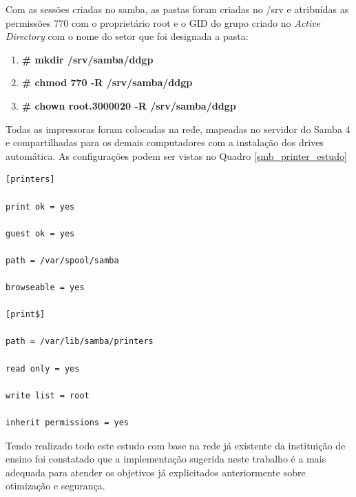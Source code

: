 Com as sessões criadas no samba, as pastas foram criadas no /srv e atribuídas as permissões 770 com o proprietário root e o GID do grupo criado no \textit{Active Directory} com o nome do setor que foi designada a pasta:

\begin{enumerate}
	\item \textbf{\# mkdir /srv/samba/ddgp}
	\item \textbf{\# chmod 770 -R /srv/samba/ddgp}
	\item \textbf{\# chown root.3000020 -R /srv/samba/ddgp}
\end{enumerate}

Todas as impressoras foram colocadas na rede, mapeadas no servidor do Samba 4 e compartilhadas para os demais computadores com a instalação dos drives automática. As configurações podem ser vistas no Quadro \ref{smb_printer_estudo}\\

\begin{lstlisting}[caption=Arquivo /etc/smb.conf com as variáveis aplicadas no estudo de caso para compartilhar impressoras.,label={smb_printer_estudo}]
[printers] 

print ok = yes 

guest ok = yes

path = /var/spool/samba 

browseable = yes

[print$] 

path = /var/lib/samba/printers 

read only = yes

write list = root 

inherit permissions = yes
\end{lstlisting}

Tendo realizado todo este estudo com base na rede já existente da instituição de ensino foi constatado que a implementação sugerida neste trabalho é a mais adequada para atender os objetivos já explicitados anteriormente sobre otimização e segurança.
